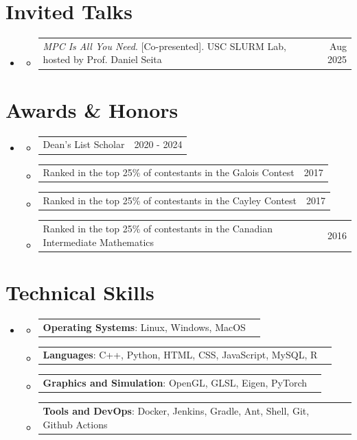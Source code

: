 \documentclass[letterpaper,11pt]{article}
\makeatletter
\newcommand{\resumePoint}[2]{
  \item
    {\begingroup\renewcommand{\arraystretch}{0.8}%
    \begin{tabularx}{\linewidth}[t]{@{}X r@{}}
      \small{#1} & \small{#2} \\
    \end{tabularx}%
    \endgroup}
}
\newif\ifFirstSubheading
\newcommand{\resumeSubHeadingListStart}{\global\FirstSubheadingtrue\begin{itemize}[leftmargin=0in, label={}]}
\newcommand{\resumeSubHeadingListEnd}{\end{itemize}}
\newcommand{\resumeItemListStart}{\begin{itemize}}
\newcommand{\resumeItemListEnd}{\end{itemize}}
\makeatother
\begin{document}
\section{Invited Talks}
\resumeSubHeadingListStart
  \item
  \resumeItemListStart
    \resumePoint{\textit{MPC Is All You Need}. [Co-presented]. USC SLURM Lab, hosted by Prof. Daniel Seita}
                {Aug 2025}
  \resumeItemListEnd
\resumeSubHeadingListEnd

\section{Awards \& Honors}
\resumeSubHeadingListStart
  \item 
  \resumeItemListStart
    \resumePoint{Dean's List Scholar}
                {2020 - 2024}
    \resumePoint{Ranked in the top 25\% of contestants in the Galois Contest}
                {2017}
    \resumePoint{Ranked in the top 25\% of contestants in the Cayley Contest}
                {2017}
    \resumePoint{Ranked in the top 25\% of contestants in the Canadian Intermediate Mathematics}
                {2016}
  \resumeItemListEnd
\resumeSubHeadingListEnd

\section{Technical Skills}
\resumeSubHeadingListStart
  \item
  \resumeItemListStart
    \resumePoint{\textbf{Operating Systems}{: Linux, Windows, MacOS}}{}
    \resumePoint{\textbf{Languages}{: C++, Python, HTML, CSS, JavaScript, MySQL, R}}{}
    \resumePoint{ \textbf{Graphics and Simulation}{: OpenGL, GLSL, Eigen, PyTorch}}{}
    \resumePoint{\textbf{Tools and DevOps}{: Docker, Jenkins, Gradle, Ant, Shell, Git, Github Actions}}{}
  \resumeItemListEnd
\resumeSubHeadingListEnd

\end{document}
